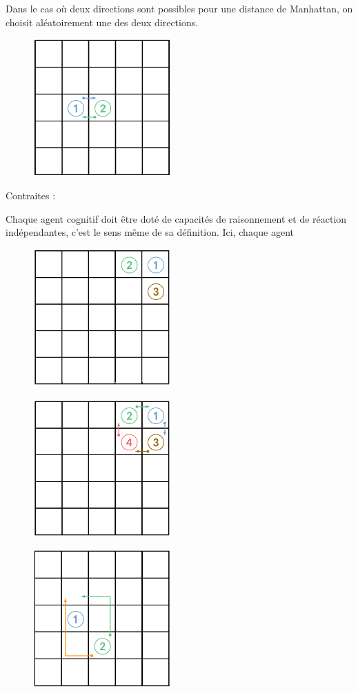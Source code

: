 \documentclass[a4paper, 12pt, french]{article}
\begin{document}
Dans le cas où deux directions sont possibles pour une distance de Manhattan, on choisit aléatoirement une des deux directions.



\begin{figure}[h]
	\centering
	\includegraphics[width=200px]{images/switch.png}
\end{figure}

Contraites :

Chaque agent cognitif doit être doté de capacités de raisonnement et de réaction indépendantes, c'est le sens même de sa définition. Ici, chaque agent

\begin{figure}[h]
	\centering
	\includegraphics[width=200px]{images/3_agents.png}
\end{figure}

\begin{figure}[h]
	\centering
	\includegraphics[width=200px]{images/4_agents.png}
\end{figure}

\begin{figure}[h]
	\centering
	\includegraphics[width=200px]{images/manhattan_equal.png}
\end{figure}

\section{}
\end{document}
